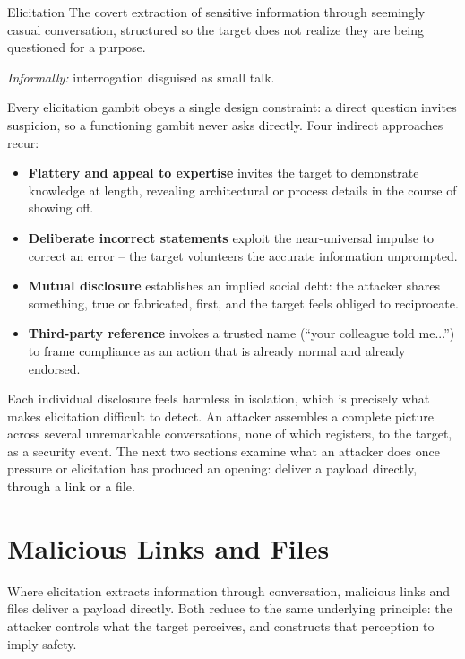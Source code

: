 \begin{definition}{Elicitation}
The covert extraction of sensitive information through seemingly casual conversation, structured
so the target does not realize they are being questioned for a purpose.

\emph{Informally:} interrogation disguised as small talk.
\end{definition}

Every elicitation gambit obeys a single design constraint: a direct question invites suspicion, so
a functioning gambit never asks directly. Four indirect approaches recur:

\begin{itemize}
\item \textbf{Flattery and appeal to expertise} invites the target to demonstrate knowledge at
length, revealing architectural or process details in the course of showing off.
\item \textbf{Deliberate incorrect statements} exploit the near-universal impulse to correct an
error -- the target volunteers the accurate information unprompted.
\item \textbf{Mutual disclosure} establishes an implied social debt: the attacker shares something,
true or fabricated, first, and the target feels obliged to reciprocate.
\item \textbf{Third-party reference} invokes a trusted name (``your colleague told me...'') to
frame compliance as an action that is already normal and already endorsed.
\end{itemize}

Each individual disclosure feels harmless in isolation, which is precisely what makes elicitation
difficult to detect. An attacker assembles a complete picture across several unremarkable
conversations, none of which registers, to the target, as a security event. The next two sections
examine what an attacker does once pressure or elicitation has produced an opening: deliver a
payload directly, through a link or a file.

\section{Malicious Links and Files}

Where elicitation extracts information through conversation, malicious links and files deliver a
payload directly. Both reduce to the same underlying principle: the attacker controls what the
target perceives, and constructs that perception to imply safety.


